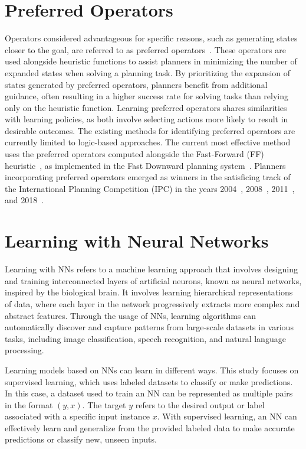 \documentclass[ppgc,diss,english]{iiufrgs}
\begin{document}
\section{Preferred Operators}
\label{sec:intro-preferred-ops}
Operators considered advantageous for specific reasons, such as generating states closer to the goal, are referred to as preferred operators~\cite{Helmert/2006,Richter.Helmert/2009}. These operators are used alongside heuristic functions to assist planners in minimizing the number of expanded states when solving a planning task.
By prioritizing the expansion of states generated by preferred operators, planners benefit from additional guidance, often resulting in a higher success rate for solving tasks than relying only on the heuristic function. Learning preferred operators shares similarities with learning policies, as both involve selecting actions more likely to result in desirable outcomes. The existing methods for identifying preferred operators are currently limited to logic-based approaches. The current most effective method uses the preferred operators computed alongside the Fast-Forward (FF) heuristic~\cite{Hoffmann.Nebel/2001}, as implemented in the Fast Downward planning system~\cite{Helmert/2006}. Planners incorporating preferred operators emerged as winners in the satisficing track of the International Planning Competition (IPC) in the years 2004~\cite{Helmert/2006}, 2008~\cite{Richter.lama.etal/2010}, 2011~\cite{Richter.lama.etal/2011}, and 2018~\cite{Seipp-fast.etal/2018}.


\section{Learning with Neural Networks}
\label{sec:intro-deep-learning}
Learning with NNs refers to a machine learning approach that involves designing and training interconnected layers of artificial neurons, known as neural networks, inspired by the biological brain.
It involves learning hierarchical representations of data, where each layer in the network progressively extracts more complex and abstract features. Through the usage of NNs, learning algorithms can automatically discover and capture patterns from large-scale datasets in various tasks, including image classification, speech recognition, and natural language processing.

Learning models based on NNs can learn in different ways. This study focuses on supervised learning, which uses labeled datasets to classify or make predictions. In this case, a dataset used to train an NN can be represented as multiple pairs in the format $(y, x)$. The target $y$ refers to the desired output or label associated with a specific input instance $x$. With supervised learning, an NN can effectively learn and generalize from the provided labeled data to make accurate predictions or classify new, unseen inputs.
\end{document}
